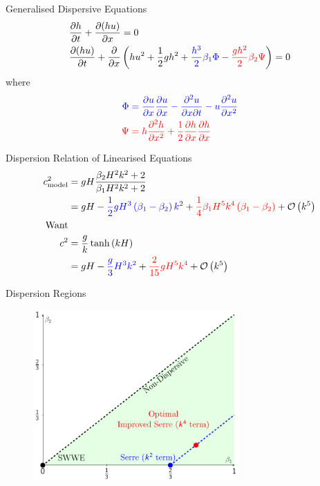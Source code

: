 \documentclass[pdf]{beamer}
\begin{document}
\begin{frame}{Generalised Dispersive Equations}
\begin{align*}
&\dfrac{\partial h}{\partial t} + \dfrac{\partial (hu)}{\partial x} = 0\\
&\dfrac{\partial (hu)}{\partial t} + \dfrac{\partial }{\partial x} \left( hu^2 + \frac{1}{2}gh^2  +  {\color{blue} \frac{h^3}{2}\beta_1 \Phi } -   {\color{red} \frac{gh^2}{2} \beta_2 \Psi}  \right)= 0 \\
\end{align*}
where
\begin{align*}
\color{blue} \Phi  & \color{blue}= \frac{\partial u}{\partial x}\frac{\partial u}{\partial x} - \frac{\partial^2 u}{\partial x \partial t} - u\frac{\partial^2 u}{\partial x^2} \\
\color{red} \Psi & \color{red}= h \frac{\partial^2 h}{\partial x^2} + \frac{1}{2} \frac{\partial h}{\partial x}\frac{\partial h}{\partial x} 
\end{align*}
\end{frame}

\begin{frame}{Dispersion Relation of Linearised Equations}
\begin{align*}
c_{\text{model}}^2 & = gH \dfrac{\beta_2 H^2 k^2 + 2}{ \beta_1H^2 k^2 + 2}
\\& = gH - {\color{blue} \frac{1}{2}gH^3 \left(\beta_1 - \beta_2\right)k^2} + {\color{red}\frac{1}{4}\beta_1 H^5 k^4\left(\beta_1 - \beta_2\right)}  + \mathcal{O}\left(k^5\right) \\
\text{Want} \\c^2  &= \frac{g}{k} \tanh\left(kH\right) \\
 &= gH - {\color{blue}\frac{g}{3} H^3 k^2} + {\color{red}\frac{2}{15} g H^5 k^4} + \mathcal{O}\left(k^5\right)
\end{align*}
\end{frame}

\begin{frame}{Dispersion Regions}
\begin{figure}
	\centering
	\includegraphics[width=0.7\textwidth]{./Pics/Tex/Explanatory/RegionsPlot/BetaPlotAll.pdf}
\end{figure}
\end{frame}
\end{document}
